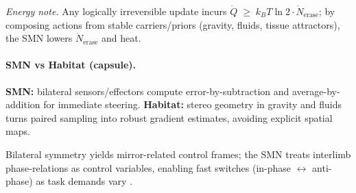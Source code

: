 \noindent\emph{Energy note.} Any logically irreversible update incurs
$\dot Q \;\ge\; k_B T \ln 2 \cdot \dot N_{\text{erase}}$;
by composing actions from stable carriers/priors (gravity, fluids, tissue attractors), the SMN lowers $\dot N_{\text{erase}}$ and heat.


\paragraph{SMN vs Habitat (capsule).}
\textbf{SMN:} bilateral sensors/effectors compute error-by-subtraction and average-by-addition for immediate steering.
\textbf{Habitat:} stereo geometry in gravity and fluids turns paired sampling into robust gradient estimates, avoiding explicit spatial maps.

Bilateral symmetry yields mirror-related control frames; the SMN treats interlimb phase-relations as control variables, enabling fast switches (in-phase $\leftrightarrow$ anti-phase) as task demands vary \citep{HakenKelsoBunz1985,Kelso1995}.

